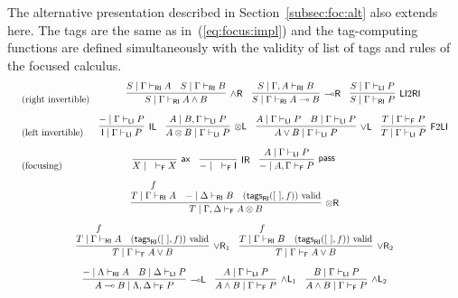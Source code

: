 \documentclass[submission,copyright,creativecommons]{eptcs}
\theoremstyle{definition}
\newcommand{\tl}{\otimes \mathsf{L}}
\newcommand{\tr}{\otimes \mathsf{R}}
\newcommand{\lright}{{\multimap}\mathsf{R}}
\newcommand{\lleft}{{\multimap}\mathsf{L}}
\newcommand{\pass}{\mathsf{pass}}
\newcommand{\unitl}{\mathsf{IL}}
\newcommand{\unitr}{\mathsf{IR}}
\newcommand{\andlone}{\land \mathsf{L}_{1}}
\newcommand{\andltwo}{\land \mathsf{L}_{2}}
\newcommand{\andr}{\land \mathsf{R}}
\newcommand{\orl}{\lor \mathsf{L}}
\newcommand{\orrone}{\lor \mathsf{R}_{1}}
\newcommand{\orrtwo}{\lor \mathsf{R}_{2}}
\newcommand{\ax}{\mathsf{ax}}
\newcommand{\ot}{\otimes}
\newcommand{\lolli}{\multimap}
\newcommand{\I}{\mathsf{I}}
\newcommand{\RI}{\mathsf{RI}}
\newcommand{\LI}{\mathsf{LI}}
\newcommand{\F}{\mathsf{F}}
\begin{document}
The alternative presentation described in Section~\ref{subsec:foc:alt} also extends here. 
The tags are the same as in~(\ref{eq:focus:impl}) and the tag-computing functions are defined simultaneously with the validity of list of tags and rules of the focused calculus.
\begin{equation*}\label{eq:focus:impl:alternative}
\resizebox{\linewidth}{!}{$
  \begin{array}{lc}
    \text{(right invertible)} &
    \infer[\andr]{S\mid\Gamma\vdash_\RI A\land B}{
      S\mid\Gamma\vdash_\RI A & S\mid\Gamma\vdash_\RI B}
    \quad
    \infer[\lright]{S\mid\Gamma\vdash_\RI A\lolli B}{
      S\mid\Gamma,A\vdash_\RI B}
    \quad
    \infer[\LI2\RI]{S\mid\Gamma\vdash_\RI P}{S\mid\Gamma\vdash_\LI P}
    \\[10pt]
    \text{(left invertible)} &
    \infer[\unitl]{\I\mid\Gamma\vdash_\LI P}{{-}\mid\Gamma\vdash_\LI P}
    \quad
    \infer[\tl]{A\ot B\mid\Gamma\vdash_\LI P}{A\mid B,\Gamma\vdash_\LI P}
    \quad
    \infer[\orl]{A\lor B\mid\Gamma\vdash_\LI P}{A\mid\Gamma\vdash_\LI P & B\mid\Gamma\vdash_\LI P}
    \quad
    \infer[\F2\LI]{T\mid\Gamma\vdash_\LI P}{T\mid\Gamma\vdash_\F P}
    \\[10pt]
    \text{(focusing)} &\hspace*{-3cm}
    \infer[\ax]{X\mid\quad\vdash_\F X}{}
    \quad
    \infer[\unitr]{{-}\mid\quad\vdash_\F\I}{}
    \quad
    \infer[\pass]{{-}\mid A,\Gamma\vdash_\F P}{A\mid\Gamma\vdash_\LI P}
    \\[10pt]
    \multicolumn{2}{c}{
      \infer[\tr]{T\mid\Gamma,\Delta\vdash_\F A\ot B}{
      \deduce{T\mid\Gamma\vdash_\RI A}{f} & {-}\mid\Delta\vdash_\RI B & (\mathsf{tags}_{\RI}([~],f)) \text{ valid}}
    }
    \\[10pt]
    \multicolumn{2}{c}{
    \infer[\orrone]{T\mid\Gamma\vdash_\F A\lor B}{
      \deduce{T\mid\Gamma\vdash_\RI A}{f} & (\mathsf{tags}_{\RI}([~],f)) \text{ valid}}
    \quad
    \infer[\orrtwo]{T\mid\Gamma\vdash_\F A\lor B}{
      \deduce{T\mid\Gamma\vdash_\RI B}{f} & (\mathsf{tags}_{\RI}([~],f)) \text{ valid}}
    }
    \\[10pt]
    \multicolumn{2}{c}{
    \infer[\lleft]{A\lolli B\mid\Lambda,\Delta\vdash_\F P}{
      {-}\mid\Lambda\vdash_\RI A & B\mid\Delta\vdash_\LI P}
    \quad
    \infer[\andlone]{A\land B\mid\Gamma\vdash_\F P}{A\mid\Gamma\vdash_\LI P}
    \quad
    \infer[\andltwo]{A\land B\mid\Gamma\vdash_\F P}{B\mid\Gamma\vdash_\LI P}
    }
  \end{array}$}
\end{equation*}
\end{document}
